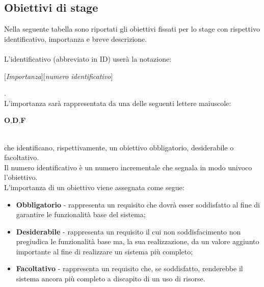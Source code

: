 \subsection{Obiettivi di stage}
Nella seguente tabella sono riportati gli obiettivi fissati per lo stage con rispettivo identificativo, importanza e breve descrizione.\\\\
L'identificativo (abbreviato in ID) userà la notazione:\\
\centerline{[\textit{Importanza}][\textit{numero identificativo}]}.\\
L'importanza sarà rappresentata da una delle seguenti lettere maiuscole:\\
\centerline{\textbf{O},\textbf{D},\textbf{F}}\\
che identificano, rispettivamente, un obiettivo obbligatorio, desiderabile o facoltativo.\\
Il numero identificativo è un numero incrementale che segnala in modo univoco l’obiettivo.\\
L'importanza di un obiettivo viene assegnata come segue:
\begin{itemize}
	\item \textbf{Obbligatorio} - rappresenta un requisito che dovrà esser soddisfatto al fine di garantire le funzionalità base del sistema;
	\item \textbf{Desiderabile} - rappresenta un requisito il cui non soddisfacimento non pregiudica le funzionalità base ma, la sua realizzazione, da un valore aggiunto importante al fine di realizzare un sistema più completo;
	\item \textbf{Facoltativo} - rappresenta un requisito che, se soddisfatto, renderebbe il sistema ancora più completo a discapito di un uso di risorse.
\end{itemize}
